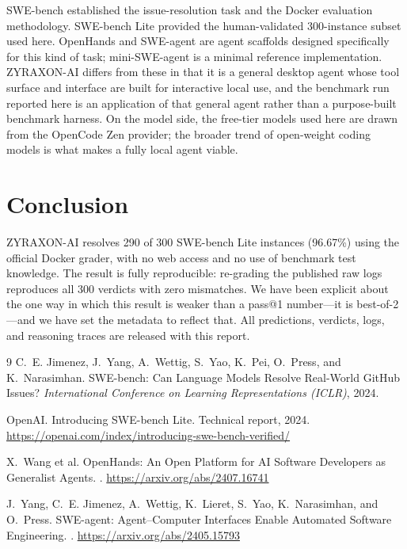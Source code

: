 \documentclass[11pt,a4paper]{article}
\begin{document}
SWE-bench \cite{jimenez2024swebench} established the issue-resolution task and the Docker
evaluation methodology. SWE-bench Lite \cite{openai2024verified} provided the
human-validated 300-instance subset used here. OpenHands \cite{wang2024openhands} and
SWE-agent \cite{yang2024sweagent} are agent scaffolds designed specifically for this kind
of task; mini-SWE-agent is a minimal reference implementation. ZYRAXON-AI differs from
these in that it is a general desktop agent whose tool surface and interface are built
for interactive local use, and the benchmark run reported here is an application of that
general agent rather than a purpose-built benchmark harness. On the model side, the
free-tier models used here are drawn from the OpenCode Zen provider; the broader trend of
open-weight coding models is what makes a fully local agent viable.

\section{Conclusion}

ZYRAXON-AI resolves 290 of 300 SWE-bench Lite instances (96.67\%) using the
official Docker grader, with no web access and no use of benchmark test knowledge. The
result is fully reproducible: re-grading the published raw logs reproduces all 300
verdicts with zero mismatches. We have been explicit about the one way in which this
result is weaker than a pass@1 number---it is best-of-2---and we have set the metadata to
reflect that. All predictions, verdicts, logs, and reasoning traces are released with
this report.

\begin{thebibliography}{9}
C.~E. Jimenez, J.~Yang, A.~Wettig, S.~Yao, K.~Pei, O.~Press, and K.~Narasimhan.
\newblock SWE-bench: Can Language Models Resolve Real-World GitHub Issues?
\newblock \emph{International Conference on Learning Representations (ICLR)}, 2024.

OpenAI.
\newblock Introducing SWE-bench Lite.
\newblock Technical report, 2024.
\newblock \url{https://openai.com/index/introducing-swe-bench-verified/}

X.~Wang et al.
\newblock OpenHands: An Open Platform for AI Software Developers as Generalist Agents.
. \url{https://arxiv.org/abs/2407.16741}

J.~Yang, C.~E. Jimenez, A.~Wettig, K.~Lieret, S.~Yao, K.~Narasimhan, and O.~Press.
\newblock SWE-agent: Agent--Computer Interfaces Enable Automated Software Engineering.
. \url{https://arxiv.org/abs/2405.15793}
\end{thebibliography}
\end{document}
